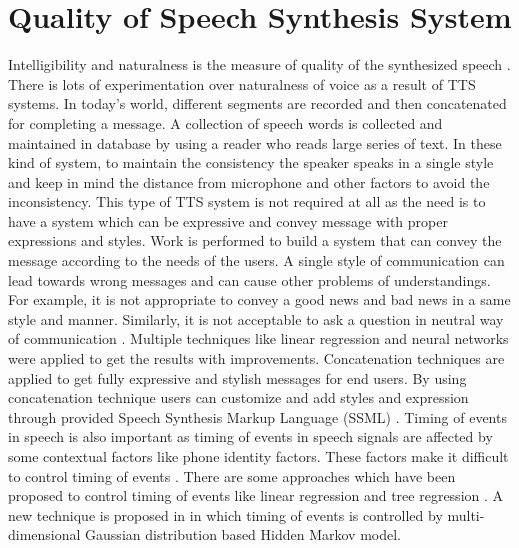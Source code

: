 \section{Quality of Speech Synthesis System}
Intelligibility and naturalness is the measure of quality of the synthesized speech \cite{swetha2013text}. 
There is lots of experimentation over naturalness of voice as a result of TTS
systems. In today’s world, different segments are recorded and then concatenated for completing a
message. A collection of speech words is collected and maintained in database by using a reader
who reads large series of text. In these kind of system, to maintain the consistency the speaker
speaks in a single style and keep in mind the distance from microphone and other factors to avoid
the inconsistency. This type of TTS system is not required at all as the need is to have a system
which can be expressive and convey message with proper expressions and styles. Work is
performed to build a system that can convey the message according to the needs of the users. A
single style of communication can lead towards wrong messages and can cause other problems of
understandings. For example, it is not appropriate to convey a good news and bad news in a same
style and manner. Similarly, it is not acceptable to ask a question in neutral way of communication \cite{eide2004corpus}.
Multiple techniques like linear regression and neural networks were applied
to get the results with improvements. Concatenation techniques are applied to get fully
expressive and stylish messages for end users. By using concatenation technique users can
customize and add styles and expression through provided Speech Synthesis Markup Language (SSML) \cite{eide2004corpus}. 
Timing of events in speech is also important as timing of events in
speech signals are affected by some contextual factors like phone identity factors. These factors
make it difficult to control timing of events \cite{tokuda2000speech}. There are some approaches which have been proposed
to control timing of events like linear regression \cite{kaiki1992linguistic} and tree regression \cite{riley1992tree}. 
A new technique is proposed in \cite{tokuda2000speech} in which timing of events is
controlled by multi-dimensional Gaussian distribution based Hidden Markov model.

